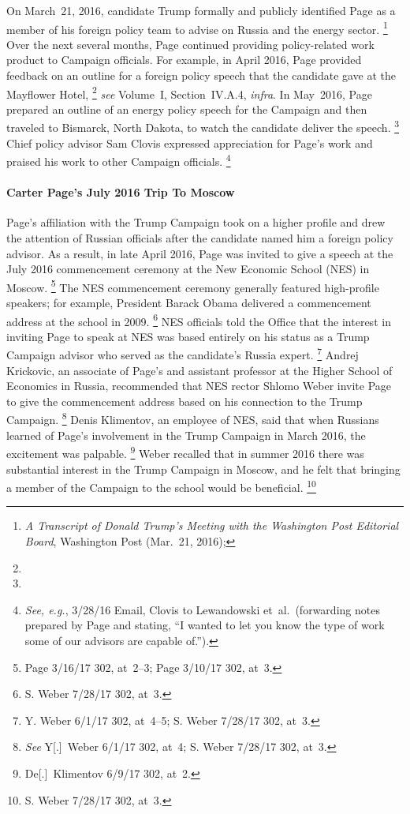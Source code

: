 On March~21, 2016, candidate Trump formally and publicly identified Page as a member of his foreign policy team to advise on Russia and the energy sector.%
\footnote{\textit{A Transcript of Donald Trump's Meeting with the Washington Post Editorial Board}, Washington Post (Mar.~21, 2016); }
Over the next several months, Page continued providing policy-related work product to Campaign officials.
For example, in April 2016, Page provided feedback on an outline for a foreign policy speech that the candidate gave at the Mayflower Hotel,%
\footnote{}
\textit{see} Volume~I, Section~IV.A.4, \textit{infra}.
In May~2016, Page prepared an outline of an energy policy speech for the Campaign and then traveled to Bismarck, North Dakota, to watch the candidate deliver the speech.%
\footnote{}
Chief policy advisor Sam Clovis expressed appreciation for Page's work and praised his work to other Campaign officials.%
\footnote{\textit{See, e.g.}, 3/28/16 Email, Clovis to Lewandowski et~al.\
(forwarding notes prepared by Page and stating, ``I wanted to let you know the type of work some of our advisors are capable of.'').}

\paragraph{Carter Page's July 2016 Trip To Moscow}

Page's affiliation with the Trump Campaign took on a higher profile and drew the attention of Russian officials after the candidate named him a foreign policy advisor.
As a result, in late April 2016, Page was invited to give a speech at the July 2016 commencement ceremony at the New Economic School (NES) in Moscow.%
\footnote{Page 3/16/17 302, at~2--3; Page 3/10/17 302, at~3.}
The NES commencement ceremony generally featured high-profile speakers; for example, President Barack Obama delivered a commencement address at the school in 2009.%
\footnote{S. Weber 7/28/17 302, at~3.}
NES officials told the Office that the interest in inviting Page to speak at NES was based entirely on his status as a Trump Campaign advisor who served as the candidate's Russia expert.%
\footnote{Y. Weber 6/1/17 302, at~4--5;
S. Weber 7/28/17 302, at~3.}
Andrej Krickovic, an associate of Page's and assistant professor at the Higher School of Economics in Russia, recommended that NES rector Shlomo Weber invite Page to give the commencement address based on his connection to the Trump Campaign.%
\footnote{\textit{See} Y[.]~Weber 6/1/17 302, at~4;
S. Weber 7/28/17 302, at~3.}
Denis Klimentov, an employee of NES, said that when Russians learned of Page's involvement in the Trump Campaign in March 2016, the excitement was palpable.%
\footnote{De[.]~Klimentov 6/9/17 302, at~2.}
Weber recalled that in summer 2016 there was substantial interest in the Trump Campaign in Moscow, and he felt that bringing a member of the Campaign to the school would be beneficial.%
\footnote{S. Weber 7/28/17 302, at~3.}


